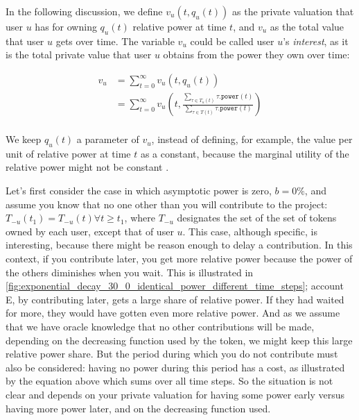 In the following discussion, we define $v_u(t, q_u(t))$ as the private valuation that user $u$ has for owning $q_u(t)$ relative power at time $t$, and $v_u$ as the total value that user $u$ gets over time.
The variable $v_u$ could be called user $u$'s \emph{interest}, as it is the total private value that user $u$ obtains from the power they own over time:

\begin{align*}
  v_u &= \sum_{t=0}^\infty v_u(t, q_u(t))\\
  &= \sum_{t=0}^\infty v_u\left(t, \frac{\sum_{\tau\in T_u(t)}\tau\mathtt{.power}(t)}{\sum_{\tau\in T(t)}\tau\mathtt{.power}(t)}\right)\\
\end{align*}

We keep $q_u(t)$ a parameter of $v_u$, instead of defining, for example, the value per unit of relative power at time $t$ as a constant, because the marginal utility of the relative power might not be constant%
.

Let's first consider the case in which asymptotic power is zero, $b = 0\%$, and assume you know that no one other than you will contribute to the project: $T_{-u}(t_1) = T_{-u}(t)\forall t\ge t_1$, where $T_{-u}$ designates the set of the set of tokens owned by each user, except that of user $u$.
This case, although specific, is interesting, because there might be reason enough to delay a contribution.
In this context, if you contribute later, you get more relative power because the power of the others diminishes when you wait.
This is illustrated in \cref{fig:exponential_decay_30_0_identical_power_different_time_steps}; account E, by contributing later, gets a large share of relative power.
If they had waited for more, they would have gotten even more relative power.
And as we assume that we have oracle knowledge that no other contributions will be made, depending on the decreasing function used by the token, we might keep this large relative power share.
But the period during which you do not contribute must also be considered: having no power during this period has a cost, as illustrated by the equation above which sums over all time steps.
So the situation is not clear and depends on your private valuation for having some power early versus having more power later, and on the decreasing function used.

